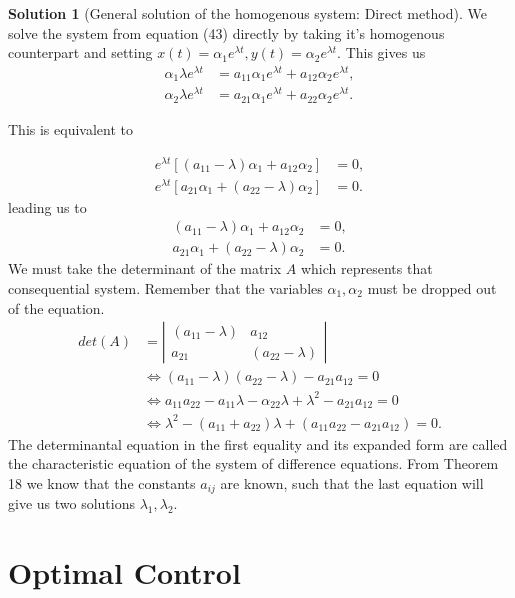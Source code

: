 \documentclass{article}
\theoremstyle{definition}
\theoremstyle{Solution}
\newtheorem{solution}{Solution}
\begin{document}
\begin{solution}[General solution of the homogenous system: Direct method]
We solve the system from equation (43) directly by taking it's homogenous counterpart and setting $x(t)=\alpha_1e^{\lambda t}, y(t)=\alpha_2e^{\lambda t}$. This gives us
\begin{equation}
	\begin{aligned}
		\alpha_1\lambda e^{\lambda t}&=a_{11}\alpha_1e^{\lambda t}+a_{12}\alpha_2e^{\lambda t}, \\
		\alpha_2\lambda e^{\lambda t}&=a_{21}\alpha_1e^{\lambda t}+a_{22}\alpha_2e^{\lambda t}.
	\end{aligned}
\end{equation}

This is equivalent to

\begin{equation}
	\begin{aligned}
		e^{\lambda t}[(a_{11}-\lambda)\alpha_1+a_{12}\alpha_2]&=0, \\
		e^{\lambda t}[a_{21}\alpha_1+(a_{22}-\lambda)\alpha_2]&=0.
	\end{aligned}
\end{equation}
leading us to
\begin{equation}
	\begin{aligned}
		(a_{11}-\lambda)\alpha_1+a_{12}\alpha_2&=0, \\
		a_{21}\alpha_1+(a_{22}-\lambda)\alpha_2&=0.
	\end{aligned}
\end{equation}
We must take the determinant of the matrix $A$ which represents that consequential system. Remember that the variables $\alpha_1, \alpha_2$ must be dropped out of the equation.
\begin{equation}
	\begin{aligned}
		det(A)&=\left|\begin{matrix}
			(a_{11}-\lambda) & a_{12} \\ 
			a_{21} & (a_{22}-\lambda) 
		\end{matrix} \right| \\
		&\Leftrightarrow (a_{11}-\lambda)(a_{22}-\lambda)-a_{21}a_{12}=0 \\
		&\Leftrightarrow a_{11}a_{22}-a_{11}\lambda-\alpha_{22}\lambda+\lambda^2-a_{21}a_{12}=0 \\
		&\Leftrightarrow \lambda^2-(a_{11}+a_{22})\lambda+(a_{11}a_{22}-a_{21}a_{12})=0.
	\end{aligned}
\end{equation}
The determinantal equation in the first equality and its expanded form are called the characteristic equation of the system of difference equations. From Theorem 18 we know that the constants $a_{ij}$ are known, such that the last equation will give us two solutions $\lambda_1,\lambda_2$.
\end{solution}

\section{Optimal Control}
\end{document}

